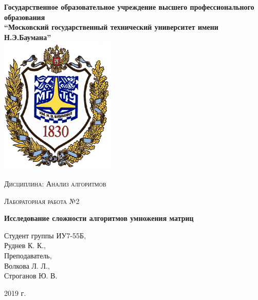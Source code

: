 \documentclass[a4paper,12pt]{report}
\begin{document}
    \begin{titlepage}

        \begin{center}
            \large
            \textbf{Государственное образовательное учреждение высшего профессионального образования\\
            “Московский государственный технический университет имени Н.Э.Баумана”\\}
            \includegraphics{bmstu-logo.png}
			\vspace{1cm}
            
            \textsc{Дисциплина: Анализ алгоритмов}
            \vspace{0.5cm}
                
            \textsc{Лабораторная работа №2}
            \vspace{1cm}
            
            {\LARGE \textbf{Исследование сложности алгоритмов умножения матриц}}
            \vspace{3cm}
                    
            \begin{flushright}
            	Студент группы ИУ7-55Б,\\   
            	Руднев К. К.,\\
            	\vspace{0.5cm}
            	Преподаватель,\\
            	Волкова Л. Л.,\\
            	Строганов Ю. В.
            	
            \end{flushright}
            \vfill
            
            2019 г.
            
            \end{center}

    \end{titlepage}
\end{document}
